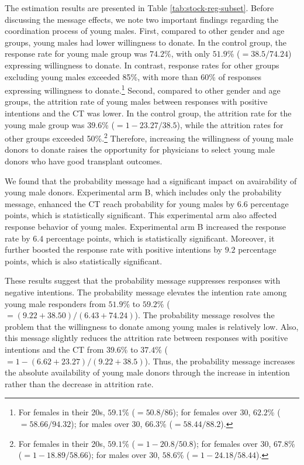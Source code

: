\documentclass[12pt, a4paper]{article}
\begin{document}
The estimation results are presented in Table \ref{tab:stock-reg-subset}. Before discussing the message effects, we note two important findings regarding the coordination process of young males. First, compared to other gender and age groups, young males had lower willingness to donate. In the control group, the response rate for young male group was \(74.2\)\%, with only \(51.9\)\% (\(=38.5/74.24\)) expressing willingness to donate. In contrast, response rates for other groups excluding young males exceeded 85\%, with more than 60\% of responses expressing willingness to donate.\footnote{For females in their 20s, \(59.1\)\% (\(=50.8/86\)); for females over 30, \(62.2\)\% (\(=58.66/94.32\)); for males over 30, \(66.3\)\% (\(=58.44/88.2\)).} Second, compared to other gender and age groups, the attrition rate of young males between responses with positive intentions and the CT was lower. In the control group, the attrition rate for the young male group was \(39.6\)\% (\(=1-23.27/38.5\)), while the attrition rates for other groups exceeded 50\%.\footnote{For females in their 20s, \(59.1\)\% (\(=1 - 20.8/50.8\)); for females over 30, \(67.8\)\% (\(=1-18.89/58.66\)); for males over 30, \(58.6\)\% (\(=1-24.18/58.44\)).} Therefore, increasing the willingness of young male donors to donate raises the opportunity for physicians to select young male donors who have good transplant outcomes.

We found that the probability message had a significant impact on avairability of young male donors. Experimental arm B, which includes only the probability message, enhanced the CT reach probability for young males by \(6.6\) percentage points, which is statistically significant. This experimental arm also affected response behavior of young males. Experimental arm B increased the response rate by \(6.4\) percentage points, which is statistically significant. Moreover, it further boosted the response rate with positive intentions by \(9.2\) percentage points, which is also statistically significant.

These results suggest that the probability message suppresses responses with negative intentions. The probability message elevates the intention rate among young male responders from \(51.9\)\% to \(59.2\)\% (\(=(9.22+38.50)/(6.43+74.24)\)). The probability message resolves the problem that the willingness to donate among young males is relatively low. Also, this message slightly reduces the attrition rate between responses with positive intentions and the CT from \(39.6\)\% to \(37.4\)\% (\(=1-(6.62+23.27)/(9.22+38.5)\)). Thus, the probability message increases the absolute availability of young male donors through the increase in intention rather than the decrease in attrition rate.
\end{document}
